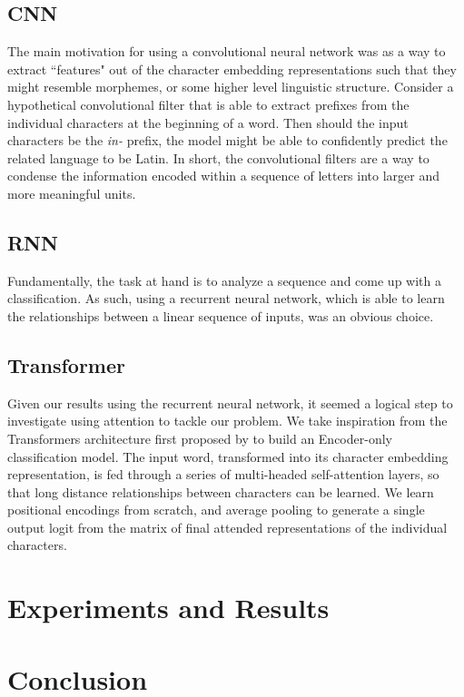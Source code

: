 \documentclass[11pt]{article}
\begin{document}
	\subsection{CNN}
	
	The main motivation for using a convolutional neural network was as a way to extract ``features" out of the character embedding representations such that they might resemble morphemes, or some higher level linguistic structure. Consider a hypothetical convolutional filter that is able to extract prefixes from the individual characters at the beginning of a word. Then should the input characters be the \textit{in-} prefix, the model might be able to confidently predict the related language to be Latin. In short, the convolutional filters are a way to condense the information encoded within a sequence of letters into larger and more meaningful units.
	
	\subsection{RNN}
	
	Fundamentally, the task at hand is to analyze a sequence and come up with a classification. As such, using a recurrent neural network, which is able to learn the relationships between a linear sequence of inputs, was an obvious choice. 
	
	\subsection{Transformer}
	
	Given our results using the recurrent neural network, it seemed a logical step to investigate using attention to tackle our problem. We take inspiration from the Transformers architecture first proposed by  to build an Encoder-only classification model. The input word, transformed into its character embedding representation, is fed through a series of multi-headed self-attention layers, so that long distance relationships between characters can be learned. We learn positional encodings from scratch, and average pooling to generate a single output logit from the matrix of final attended representations of the individual characters.
	
	\section{Experiments and Results} \label{sec:exp}
	
	\section{Conclusion} \label{sec:conc}
	
	
	
\end{document}
